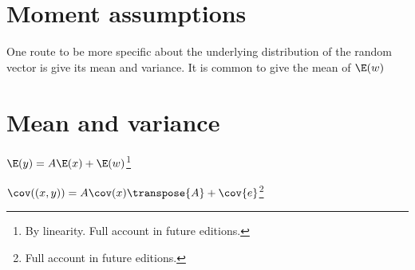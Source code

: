 \section*{Moment assumptions}

One route to be more specific about the underlying distribution of the random vector is give its mean and variance.
It is common to give the mean of $\E (w)$

\section*{Mean and variance}

\begin{proposition}
$\E (y) = A\E (x) + \E (w)$\footnote{By linearity. Full account in future editions.}
\end{proposition}

\begin{proposition}
$\cov((x, y)) = A\cov(x)\transpose{A} + \cov{e}$\footnote{Full account in future editions.}
\end{proposition}
